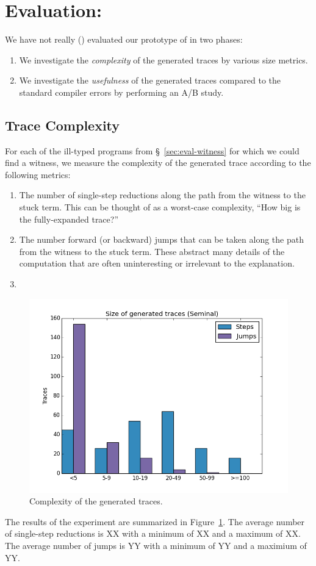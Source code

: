 \section{Evaluation: \nanomaly}
\label{sec:evaluation-nanomaly}
We have not really () evaluated our prototype of \nanomaly in two phases:
%
\begin{enumerate}
\item We investigate the \emph{complexity} of the generated traces by various size metrics.
\item We investigate the \emph{usefulness} of the generated traces compared to the standard compiler errors by performing an A/B study.
\end{enumerate}

\subsection{Trace Complexity}
\label{sec:trace-complexity}
For each of the ill-typed programs from \S~\ref{sec:eval-witness} for
which we could find a witness, we measure the complexity of the
generated trace according to the following metrics:
%
\begin{enumerate}
\item The number of single-step reductions along the path from the
  witness to the stuck term. This can be thought of as a worst-case
  complexity, \ie ``How big is the fully-expanded trace?''
\item The number forward (or backward) jumps that can be taken along the
  path from the witness to the stuck term. These abstract many details
  of the computation that are often uninteresting or irrelevant to the
  explanation.
\item {}
\end{enumerate}
%
\begin{figure}[t]
\centering
  \includegraphics[width=\linewidth]{trace_size_seminal.png}
\caption{Complexity of the generated traces.}
\label{fig:results-complexity}
\end{figure}
%
The results of the experiment are summarized in
Figure~\ref{fig:results-complexity}.
%
The average number of single-step reductions is XX with a minimum of XX
and a maximum of XX. The average number of jumps is YY with a minimum of
YY and a maximium of YY.

